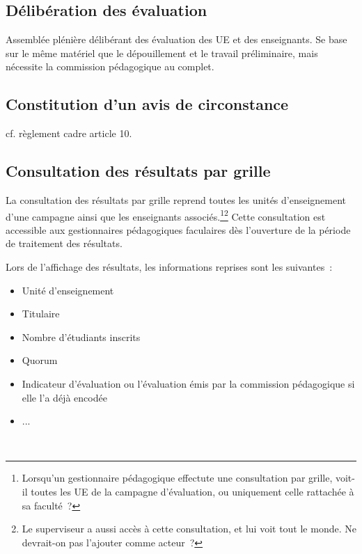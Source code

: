 \documentclass[a4paper,11pt]{report}
\begin{document}
\subsection{Délibération des évaluation}\label{sec:deliberation-eval}
Assemblée plénière délibérant des évaluation des UE et des enseignants.
Se base sur le même matériel que le dépouillement et le travail préliminaire, mais nécessite la commission pédagogique au complet.




\subsection{Constitution d'un avis de circonstance}\label{sec:avis-circonstance}
cf. règlement cadre article 10.




\subsection{Consultation des résultats par grille}
La consultation des résultats par grille reprend toutes les unités d'enseignement  d'une campagne ainsi que les enseignants associés.\footnote{Lorsqu'un gestionnaire pédagogique effectute une consultation par grille, voit-il toutes les UE de la campagne d'évaluation, ou uniquement celle rattachée à sa faculté~?}\footnote{Le superviseur a aussi accès à cette consultation, et lui voit tout le monde. Ne devrait-on pas l'ajouter comme acteur~?}
Cette consultation est accessible aux gestionnaires pédagogiques faculaires dès l'ouverture de la période de traitement des résultats.

Lors de l'affichage des résultats, les informations reprises sont les suivantes~:
\begin{itemize}
	\item Unité d'enseignement
	\item Titulaire
	\item Nombre d'étudiants inscrits
	\item Quorum
	\item Indicateur d'évaluation ou l'évaluation émis par la commission pédagogique si elle l'a déjà encodée
	\item ...
\end{itemize}
~\\
\end{document}
